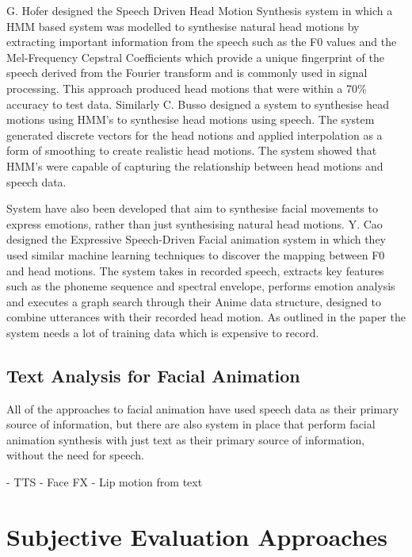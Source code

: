 \documentclass[bsc,frontabs,twoside,singlespacing,parskip]{infthesis}
\begin{document}
G. Hofer designed the Speech Driven Head Motion Synthesis system \cite{speech_driven_head_motion} in which a HMM based system was modelled to synthesise natural head motions by extracting important information from the speech such as the F0 values and the Mel-Frequency Cepstral Coefficients which provide a unique fingerprint of the speech derived from the Fourier transform and is commonly used in signal processing. This approach produced head motions that were within a 70\% accuracy to test data. Similarly C. Busso designed a system to synthesise head motions using HMM's to synthesise head motions using speech. \cite{busso_rigid} The system generated discrete vectors for the head notions and applied interpolation as a form of smoothing to create realistic head motions. The system showed that HMM's were capable of capturing the relationship between head motions and speech data.

System have also been developed that aim to synthesise facial movements to express emotions, rather than just synthesising natural head motions. Y. Cao designed the Expressive Speech-Driven Facial animation system  \cite{expressive_speech_animation} in which they used similar machine learning techniques to discover the mapping between F0 and head motions. The system takes in recorded speech, extracts key features such as the phoneme sequence and spectral envelope, performs emotion analysis and executes a graph search through their Anime data structure, designed to combine utterances with their recorded head motion. As outlined in the paper the system needs a lot of training data which is expensive to record. 

\subsection{Text Analysis for Facial Animation}

All of the approaches to facial animation have used speech data as their primary source of information, but there are also system in place that perform facial animation synthesis with just text as their primary source of information, without the need for speech.


- TTS \cite{may_i_talk_to_you}
- Face FX
- Lip motion from text \cite{lip_motion} \\


\section{Subjective Evaluation Approaches}
\end{document}
